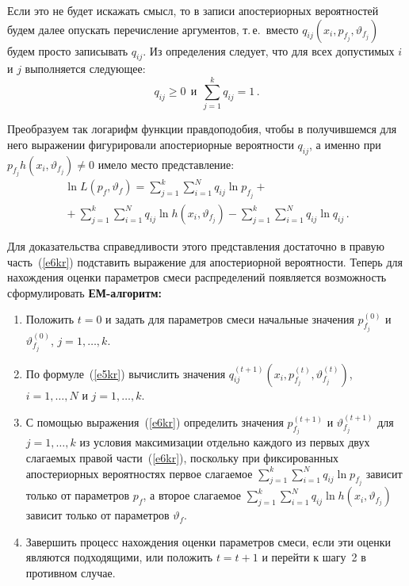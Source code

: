 \begin{multicols}{2}
     Если это не будет искажать смысл, то в записи апостериорных вероятностей 
будем далее опускать перечисление аргументов, т.\,е.\ вместо $q_{ij}(x_i, p_{f_j}, 
\vartheta_{f_j})$ будем просто записывать $q_{ij}$. Из определения следует, что 
для всех допустимых $i$ и $j$ выполняется следующее: 
     $$
     q_{ij} \geq 0\ \ \mbox{и}\  \ \sum\limits_{j=1}^k q_{ij}=1\,.
     $$
     
     Преобразуем так логарифм функции правдоподобия, чтобы в получившемся 
для него выражении фигурировали апостериорные вероятности $q_{ij}$, а именно 
при $p_{f_j} h(x_i,\vartheta_{f_j})\not=0$ имело место представление:
     \begin{multline}
     \ln L(p_f,\vartheta_f ) = \sum\limits_{j=1}^k\sum\limits_{i=1}^N q_{ij}\ln 
p_{f_j} +{}\\
{}+\sum\limits_{j=1}^k\sum\limits_{i=1}^N q_{ij}\ln h(x_i,\vartheta_{f_j})-
 \sum\limits_{j=1}^k\sum\limits_{i=1}^N q_{ij} \ln q_{ij}\,.
     \label{e6kr}
     \end{multline}
     
     Для доказательства справедливости этого представления достаточно в 
правую часть~(\ref{e6kr}) подставить выражение для апостериорной 
вероятности. Теперь для нахождения оценки параметров смеси распределений 
появляется возможность сформулировать
\textbf{ЕМ-ал\-го\-ритм:}


\noindent
\begin{enumerate}[1.]
\item Положить $t=0$ и задать для параметров смеси начальные значения 
$p^{(0)}_{f_j}$ и $\vartheta^{(0)}_{f_j}$, $j=1,\ldots , k$. 
\item По формуле~(\ref{e5kr}) вычислить значения 
$q_{ij}^{(t+1)}\left ( x_i,p_{f_j}^{(t)}, \vartheta_{f_j}^{(t)}\right )$, $i=1,\ldots , N$ и 
$j=1,\ldots ,k$.
\item С помощью выражения~(\ref{e6kr}) определить значения 
$p_{f_j}^{(t+1)}$ и $\vartheta_{f_j}^{(t+1)}$ для $j=1,\ldots ,k$ из условия 
максимизации отдельно каждого из первых двух слагаемых правой 
части~(\ref{e6kr}), поскольку при фиксированных апостериорных вероятностях 
первое %
слагаемое $\sum\limits_{j=1}^k\sum\limits_{i=1}^N q_{ij}\ln p_{f_j}$ 
зависит только от па\-ра\-мет\-ров $p_f$, а второе слагаемое 
$\sum\limits_{j=1}^k\sum\limits_{i=1}^N q_{ij}\ln h(x_i,\vartheta_{f_j})$ зависит 
только от па\-ра\-мет\-ров $\vartheta_f$.
\item Завершить процесс нахождения оценки параметров смеси, если эти оценки 
являются подходящими, или положить $t=t+1$ и перейти к шагу~2 в противном 
случае. 
\end{enumerate}
\bigskip
     

\end{multicols}
